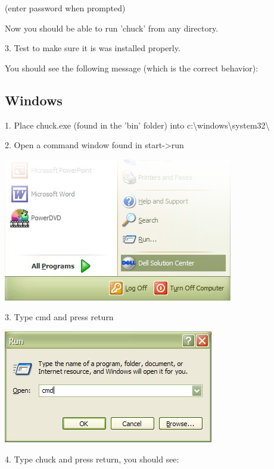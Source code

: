 (enter password when prompted)


Now you should be able to run 'chuck' from any directory.

3. Test to make sure it is was installed properly.


You should see the following message (which is the correct behavior):



\subsection{Windows}

1. Place chuck.exe (found in the 'bin' folder) into c:\textbackslash windows\textbackslash system32\textbackslash

2. Open a command window found in start-\textgreater run

\includegraphics{images/startmenu}

3. Type cmd and press return

\includegraphics{images/cmd}

4. Type chuck and press return, you should see:


